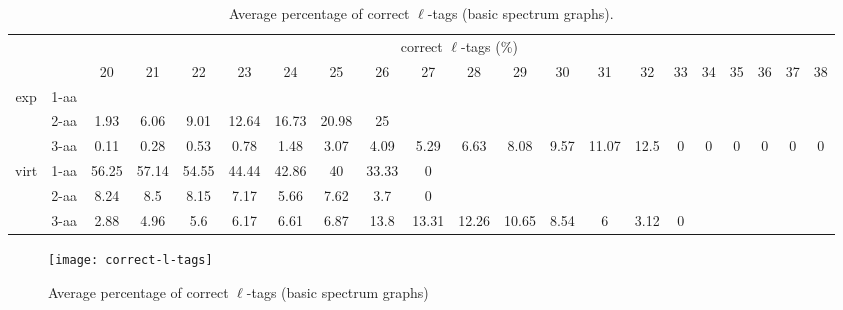 \documentclass{article}[12pt]
\begin{document}
\begin{landscape}
\begin{table}[h]\tiny
\vspace{3mm}
{\centering
\begin{center}
\begin{tabular}{|c|l|c|c|c|c|c|c|c|c|c|c|c|c|c|c|c|c|c|c|c|}
  \hline
  \multicolumn{2}{|c|}{ } & \multicolumn{ 19 }{|c|}{ correct $\ell$-tags (\%)} \\
  \cline{3- 21}
  \multicolumn{2}{|c|}{ }  & 20 & 21 & 22 & 23 & 24 & 25 & 26 & 27 & 28 & 29 & 30 & 31 & 32 & 33 & 34 & 35 & 36 & 37 & 38\\
  \hline
  \multirow{3}{*}{exp}
&  1-aa  &  &  &  &  &  &  &  &  &  &  &  &  &  &  &  &  &  &  & \\
&  2-aa  & 1.93 & 6.06 & 9.01 & 12.64 & 16.73 & 20.98 & 25 &  &  &  &  &  &  &  &  &  &  &  & \\
&  3-aa  & 0.11 & 0.28 & 0.53 & 0.78 & 1.48 & 3.07 & 4.09 & 5.29 & 6.63 & 8.08 & 9.57 & 11.07 & 12.5 & 0 & 0 & 0 & 0 & 0 & 0\\
 \hline
  \multirow{3}{*}{virt} 
&  1-aa  & 56.25 & 57.14 & 54.55 & 44.44 & 42.86 & 40 & 33.33 & 0 &  &  &  &  &  &  &  &  &  &  & \\
&  2-aa  & 8.24 & 8.5 & 8.15 & 7.17 & 5.66 & 7.62 & 3.7 & 0 &  &  &  &  &  &  &  &  &  &  & \\
&  3-aa  & 2.88 & 4.96 & 5.6 & 6.17 & 6.61 & 6.87 & 13.8 & 13.31 & 12.26 & 10.65 & 8.54 & 6 & 3.12 & 0 &  &  &  &  & \\
 \hline
\end{tabular}
\end{center}
\par}
\centering
\caption{ Average percentage of correct $\ell$-tags (basic spectrum graphs).}
\label{table:correct-l-tags}
\vspace{3mm}
\end{table}

\end{landscape}

\begin{figure}
  \begin{center}
\texttt{[image: correct-l-tags]}
\end{center}
\caption{Average percentage of correct $\ell$-tags (basic spectrum graphs)}
  \label{fig:correct-l-tags}
\end{figure}
\end{document}
